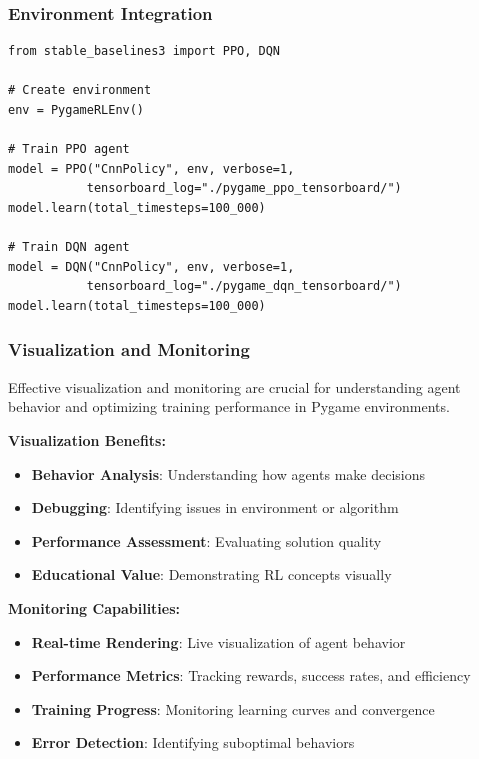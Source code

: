 \documentclass[12pt]{article}
\begin{document}
{{{\subsubsection{Environment Integration}

\begin{verbatim}
from stable_baselines3 import PPO, DQN

# Create environment
env = PygameRLEnv()

# Train PPO agent
model = PPO("CnnPolicy", env, verbose=1, 
           tensorboard_log="./pygame_ppo_tensorboard/")
model.learn(total_timesteps=100_000)

# Train DQN agent
model = DQN("CnnPolicy", env, verbose=1, 
           tensorboard_log="./pygame_dqn_tensorboard/")
model.learn(total_timesteps=100_000)
\end{verbatim}

\subsubsection{Visualization and Monitoring}

Effective visualization and monitoring are crucial for understanding agent behavior and optimizing training performance in Pygame environments.

\textbf{Visualization Benefits:}
\begin{itemize}
    \item \textbf{Behavior Analysis}: Understanding how agents make decisions
    \item \textbf{Debugging}: Identifying issues in environment or algorithm
    \item \textbf{Performance Assessment}: Evaluating solution quality
    \item \textbf{Educational Value}: Demonstrating RL concepts visually
\end{itemize}

\textbf{Monitoring Capabilities:}
\begin{itemize}
    \item \textbf{Real-time Rendering}: Live visualization of agent behavior
    \item \textbf{Performance Metrics}: Tracking rewards, success rates, and efficiency
    \item \textbf{Training Progress}: Monitoring learning curves and convergence
    \item \textbf{Error Detection}: Identifying suboptimal behaviors
\end{itemize}

}}}
\end{document}
